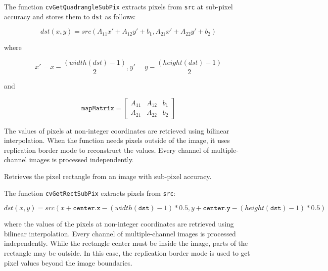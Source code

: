 \begin{description}
\end{description}

The function \texttt{cvGetQuadrangleSubPix} extracts pixels from \texttt{src} at sub-pixel accuracy and stores them to \texttt{dst} as follows:

\[
dst(x, y)= src( A_{11} x' + A_{12} y' + b_1, A_{21} x' + A_{22} y' + b_2)
\]

where

\[
x'=x-\frac{(width(dst)-1)}{2}, 
y'=y-\frac{(height(dst)-1)}{2}
\]

and

\[
\texttt{mapMatrix} = \begin{bmatrix}
A_{11} & A_{12} & b_1\\
A_{21} & A_{22} & b_2
\end{bmatrix}
\]

The values of pixels at non-integer coordinates are retrieved using bilinear interpolation. When the function needs pixels outside of the image, it uses replication border mode to reconstruct the values. Every channel of multiple-channel images is processed independently.


Retrieves the pixel rectangle from an image with sub-pixel accuracy.
 

\begin{description}
\end{description}

The function \texttt{cvGetRectSubPix} extracts pixels from \texttt{src}:

\[
dst(x, y) = src(x + \texttt{center.x} - (width(\texttt{dst})-1)*0.5, y + \texttt{center.y} - (height(\texttt{dst} )-1)*0.5)
\]

where the values of the pixels at non-integer coordinates are retrieved
using bilinear interpolation. Every channel of multiple-channel
images is processed independently. While the rectangle center
must be inside the image, parts of the rectangle may be
outside. In this case, the replication border mode is used to get
pixel values beyond the image boundaries.


